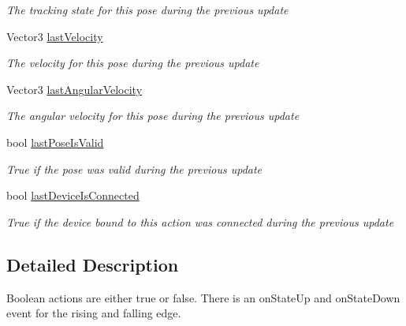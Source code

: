 \begin{DoxyCompactItemize}
\begin{DoxyCompactList}\small\item\em The tracking state for this pose during the previous update \end{DoxyCompactList}\item 
Vector3 \mbox{\hyperlink{interface_valve_1_1_v_r_1_1_i_steam_v_r___action___pose_a4d80572375879d684549fc318028131c}{last\+Velocity}}
\begin{DoxyCompactList}\small\item\em The velocity for this pose during the previous update \end{DoxyCompactList}\item 
Vector3 \mbox{\hyperlink{interface_valve_1_1_v_r_1_1_i_steam_v_r___action___pose_afb4337fcf08a6e62d0fe6fd43e7e7c1d}{last\+Angular\+Velocity}}
\begin{DoxyCompactList}\small\item\em The angular velocity for this pose during the previous update \end{DoxyCompactList}\item 
bool \mbox{\hyperlink{interface_valve_1_1_v_r_1_1_i_steam_v_r___action___pose_a710f0141d26fe73390796c725474d214}{last\+Pose\+Is\+Valid}}
\begin{DoxyCompactList}\small\item\em True if the pose was valid during the previous update \end{DoxyCompactList}\item 
bool \mbox{\hyperlink{interface_valve_1_1_v_r_1_1_i_steam_v_r___action___pose_ab394813e83a7e73620f0c98bca90915a}{last\+Device\+Is\+Connected}}
\begin{DoxyCompactList}\small\item\em True if the device bound to this action was connected during the previous update \end{DoxyCompactList}\end{DoxyCompactItemize}


\subsection{Detailed Description}
Boolean actions are either true or false. There is an on\+State\+Up and on\+State\+Down event for the rising and falling edge. 



